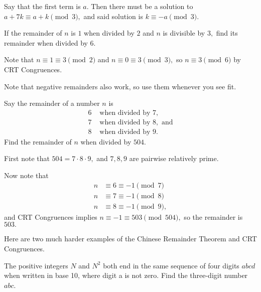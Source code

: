 \documentclass{article}
\begin{document}
\begin{sol}
Say that the first term is $a.$ Then there must be a solution to $a+7k\equiv a+k\pmod{3},$ and said solution is $k\equiv -a\pmod{3}.$
\end{sol}

\begin{exam}
If the remainder of $n$ is $1$ when divided by $2$ and $n$ is divisible by $3,$ find its remainder when divided by $6.$
\end{exam}

\begin{sol}
Note that $n\equiv 1\equiv 3\pmod{2}$ and $n\equiv 0\equiv 3\pmod{3},$ so $n\equiv3\pmod{6}$ by CRT Congruences.
\end{sol}

Note that negative remainders also work, so use them whenever you see fit.

\begin{exam}
Say the remainder of a number $n$ is
\begin{align*}
6 &\text{ when divided by } 7, \\
7 &\text{ when divided by } 8, \text{ and}\\
8 &\text{ when divided by } 9.
\end{align*}
Find the remainder of $n$ when divided by $504.$
\end{exam}

\begin{sol}
First note that $504=7\cdot 8\cdot 9,$ and $7,8,9$ are pairwise relatively prime.

Now note that
\begin{align*}
n&\equiv 6\equiv -1\pmod{7} \\
n&\equiv 7\equiv -1\pmod{8} \\
n&\equiv 8\equiv -1\pmod{9},
\end{align*}
and CRT Congruences implies $n\equiv -1\equiv 503\pmod{504},$ so the remainder is $503.$
\end{sol}

Here are two much harder examples of the Chinese Remainder Theorem and CRT Congruences.

\begin{exam}[AIME I 2014/8]
The positive integers $N$ and $N^2$ both end in the same sequence of four digits $abcd$ when written in base 10, where digit a is not zero. Find the three-digit number $abc$.
\end{exam}
\end{document}

